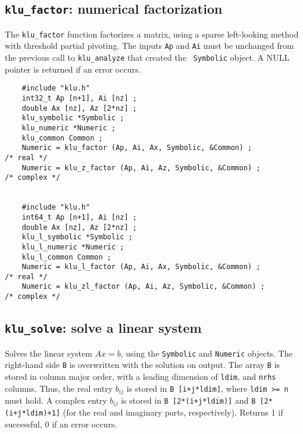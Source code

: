 \documentclass[11pt]{article}
\begin{document}
\subsection{{\tt klu\_factor}: numerical factorization}

The {\tt klu\_factor} function factorizes a matrix, using a sparse left-looking
method with threshold partial pivoting.  The inputs {\tt Ap} and {\tt Ai} must
be unchanged from the previous call to {\tt klu\_analyze} that created the {\tt
Symbolic} object.  A NULL pointer is returned if an error occurs.

{\footnotesize
\begin{verbatim}
    #include "klu.h"
    int32_t Ap [n+1], Ai [nz] ;
    double Ax [nz], Az [2*nz] ;
    klu_symbolic *Symbolic ;
    klu_numeric *Numeric ;
    klu_common Common ;
    Numeric = klu_factor (Ap, Ai, Ax, Symbolic, &Common) ;                            /* real */
    Numeric = klu_z_factor (Ap, Ai, Az, Symbolic, &Common) ;                          /* complex */


    #include "klu.h"
    int64_t Ap [n+1], Ai [nz] ;
    double Ax [nz], Az [2*nz] ;
    klu_l_symbolic *Symbolic ;
    klu_l_numeric *Numeric ;
    klu_l_common Common ;
    Numeric = klu_l_factor (Ap, Ai, Ax, Symbolic, &Common) ;                          /* real */
    Numeric = klu_zl_factor (Ap, Ai, Az, Symbolic, &Common) ;                         /* complex */
\end{verbatim}
}

\subsection{{\tt klu\_solve}: solve a linear system}

Solves the linear system $Ax=b$, using the {\tt Symbolic} and  {\tt Numeric}
objects.  The right-hand side {\tt B} is overwritten with the solution on
output.  The array {\tt B} is stored in column major order, with a leading
dimension of {\tt ldim}, and {\tt nrhs} columns.  Thus, the real entry $b_{ij}$
is stored in {\tt B [i+j*ldim]}, where {\tt ldim >= n} must hold.  A complex
entry $b_{ij}$ is stored in {\tt B [2*(i+j*ldim)]} and {\tt B [2*(i+j*ldim)+1]}
(for the real and imaginary parts, respectively).  Returns 1 if successful,
0 if an error occurs.
\end{document}
